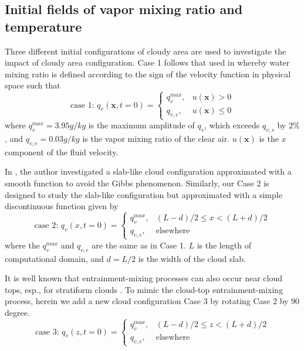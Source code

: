 \documentclass[draft,jgrga]{AGUTeX}
\begin{document}
\begin{article}
\subsection{Initial fields of vapor mixing ratio and temperature}
Three different initial configurations of cloudy area are used to investigate the impact of cloudy area configuration. Case 1 follows that used in \cite{And04} whereby water mixing ratio is defined according to the sign of the velocity function in physical space such that
\begin{equation}
\mbox{case 1: } q_v(\mathbf{x},t=0) = 
\left\{\begin{array}{lr}
q_v^{max}, & u(\mathbf{x}) > 0\\
q_{v,e}, & u(\mathbf{x}) \le 0
\end{array}\right.\label{case1}
\end{equation}
where $q_v^{max} = 3.95 g/kg$ is the maximum amplitude of $q_v$, which exceeds $q_{v,s}$ by $2\%$, and $q_{v,e} = 0.03g/kg$ is the vapor mixing ratio of the clear air. $u(\mathbf{x})$ is the $x$ component of the fluid velocity. 

In \cite{Kumar11}, the author investigated a slab-like cloud configuration approximated with a smooth function to avoid the Gibbs phenomenon. Similarly, our Case 2 is designed to study the slab-like configuration but approximated with a simple discontinuous function given by
\begin{equation}
\mbox{case 2: } q_v(x,t=0) = 
\left\{\begin{array}{lr}
q_v^{max}, & (L-d)/2 \le x < (L+d)/2\\
q_{v,e}, & \mbox{elsewhere}
\end{array}\right.\label{case2}
\end{equation}
where the $q_v^{max}$ and $q_{v,e}$ are the same as in Case 1.
$L$ is the length of computational domain, and $d = L/2$ is the width of the cloud slab.

It is well known that entrainment-mixing processes can also occur near cloud tops, esp., for stratiform clouds \cite{Lu2011, Yum2015}. To mimic the cloud-top entrainment-mixing process, herein we add a new cloud configuration Case 3 by rotating Case 2 by $90$ degree.
\begin{equation}
\mbox{case 3: } q_v(z,t=0) = 
\left\{\begin{array}{lr}
q_v^{max}, & (L-d)/2 \le z < (L+d)/2\\
q_{v,e}, & \mbox{elsewhere}
\end{array}\right.\label{case3}
\end{equation}


\end{article}
\end{document}
